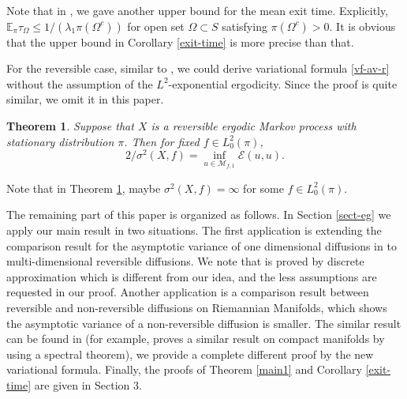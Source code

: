 \documentclass[12pt,reqno]{article}
\newtheorem{thm}{Theorem}[section]
\theoremstyle{definition}
\theoremstyle{remark}
\theoremstyle{example}
\numberwithin{equation}{section}
\newcommand{\scr}[1]{\mathscr #1}
\def\e{\scr E}
\def\bE{\mathbb E}
\def\lb{\label}
\begin{document}
Note that in \cite[Remark 3.6(1)]{HKMW20}, we gave another upper bound for the mean exit time. Explicitly, $\bE_\pi\tau_\Omega\leq 1/(\lambda_1\pi(\Omega^c))$ for open set $\Omega\subset S$ satisfying $\pi(\Omega^c)>0$. It is obvious that the upper bound in Corollary \ref{exit-time} is more precise than that.












For the reversible case,  similar to \cite[Theorem 1.3]{HM21+}, we could derive variational formula \eqref{vf-av-r} without the assumption of the $L^2$-exponential ergodicity. Since the proof is quite similar, we omit it in this paper.

\begin{thm}\lb{main-r}
Suppose that $X$ is a reversible ergodic Markov process with stationary distribution $\pi$. Then for fixed $f\in L^2_0(\pi)$,
$$
2/\sigma^2(X,f)=\inf_{u\in\scr{M}_{f,1}}\e(u,u).
$$
\end{thm}


Note that in Theorem \ref{main-r}, maybe $\sigma^2(X,f)=\infty$ for some $f\in L^2_0(\pi)$.


The remaining part of this paper is organized as follows. In Section \ref{sect-eg} we apply our main result in two situations.
The first application is extending the comparison result for the asymptotic variance of one dimensional diffusions in \cite[Theorem 1]{RR14} to multi-dimensional reversible diffusions.
We note that \cite[Theorem 1]{RR14} is proved by discrete approximation which is different from our idea, and the less assumptions are requested in our proof. Another application is a comparison result between reversible and non-reversible diffusions on Riemannian Manifolds, which shows the asymptotic variance of a non-reversible diffusion is smaller.
The similar result can be found in \cite{DLP16,HNW15}(for example, \cite{HNW15} proves a similar result on compact manifolds by using a spectral theorem), we provide a complete different proof by the new variational formula.
 Finally, the proofs of Theorem \ref{main1} and Corollary \ref{exit-time} are given in Section 3.
\end{document}
